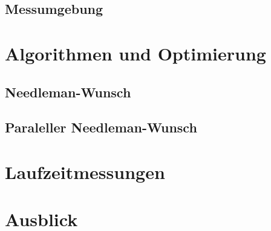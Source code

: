 \documentclass[a4paper]{article}
\begin{document}

\subsection{Messumgebung}

\section{Algorithmen und Optimierung}
\subsection{Needleman-Wunsch}
\subsection{Paraleller Needleman-Wunsch}

\section{Laufzeitmessungen}



\section{Ausblick}
\end{document}
